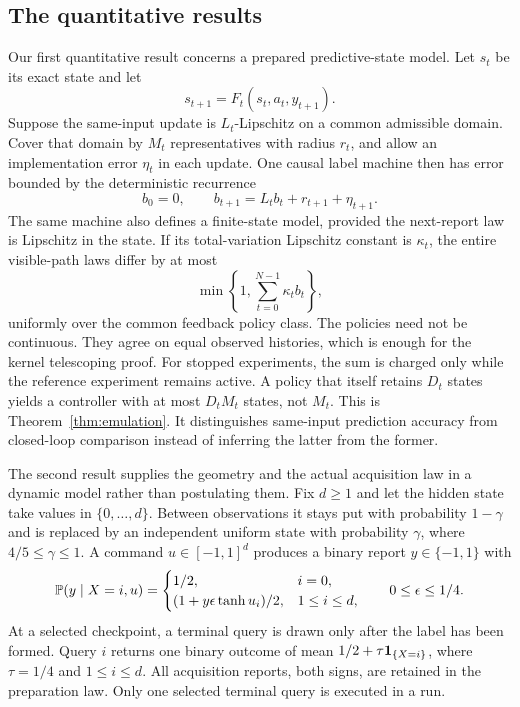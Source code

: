 \subsection{The quantitative results}
Our first quantitative result concerns a prepared predictive-state model.
Let $s_t$ be its exact state and let
\[
 s_{t+1}=F_t(s_t,a_t,y_{t+1}).
\]
Suppose the same-input update is $L_t$-Lipschitz on a common admissible
domain. Cover that domain by $M_t$ representatives with radius $r_t$,
and allow an implementation error $\eta_t$ in each update. One causal
label machine then has error bounded by the deterministic recurrence
\begin{equation}\label{eq:intro-recursion}
 b_0=0,\qquad b_{t+1}=L_tb_t+r_{t+1}+\eta_{t+1}.
\end{equation}
The same machine also defines a finite-state model, provided the next-report
law is Lipschitz in the state. If its total-variation Lipschitz constant is
$\kappa_t$, the entire visible-path laws differ by at most
\begin{equation}\label{eq:intro-path-error}
 \min\left\{1,\sum_{t=0}^{N-1}\kappa_tb_t\right\},
\end{equation}
uniformly over the common feedback policy class. The policies need not be
continuous. They agree on equal observed histories, which is enough for the
kernel telescoping proof. For stopped experiments, the sum is charged only
while the reference experiment remains active. A policy that itself retains
$D_t$ states yields a controller with at most $D_tM_t$ states, not $M_t$.
This is Theorem~\ref{thm:emulation}. It distinguishes same-input prediction
accuracy from closed-loop comparison instead of inferring the latter from
the former.

The second result supplies the geometry and the actual acquisition law in a
dynamic model rather than postulating them. Fix $d\ge1$ and let the hidden
state take values in $\{0,\ldots,d\}$. Between observations it stays put with
probability $1-\gamma$ and is replaced by an independent uniform state with
probability $\gamma$, where $4/5\le\gamma\le1$. A command
$u\in[-1,1]^d$ produces a binary report $y\in\{-1,1\}$ with
\begin{equation}\label{eq:intro-sensor}
 \mathbb P(y\mid X=i,u)=
 \begin{cases}
  1/2,&i=0,\\
  (1+y\epsilon\tanh u_i)/2,&1\le i\le d,
 \end{cases}
 \qquad 0\le\epsilon\le1/4.
\end{equation}
At a selected checkpoint, a terminal query is drawn only after the label has
been formed. Query $i$ returns one binary outcome of mean
$1/2+\tau\mathbf 1_{\{X=i\}}$, where $\tau=1/4$ and $1\le i\le d$.
All acquisition reports, both signs, are retained in the preparation law.
Only one selected terminal query is executed in a run.

